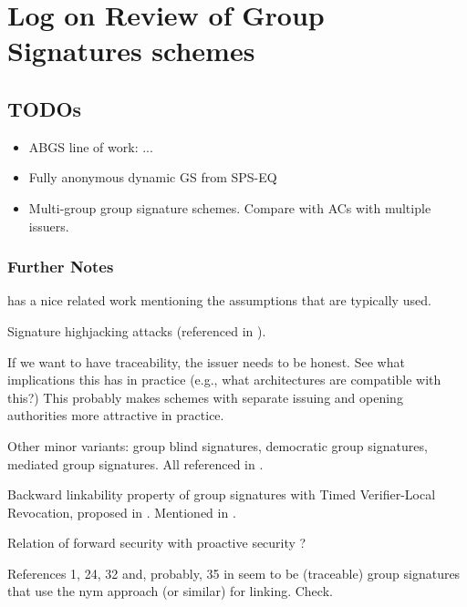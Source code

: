 \section{Log on Review of Group Signatures schemes}
\label{app:ac}

\subsection{TODOs}

\begin{itemize}
\item ABGS line of work: \cite{khad07a,khad07b}...
\item Fully anonymous dynamic GS from SPS-EQ \cite{ds16}
\item Multi-group group signature schemes. Compare with ACs with multiple
  issuers.
\end{itemize}

\subsubsection{Further Notes}


\cite{ehk+19} has a nice related work mentioning the assumptions that are
typically used.

Signature highjacking attacks (referenced in \cite{ehk+19}).

If we want to have traceability, the issuer needs to be honest. See what
implications this has in practice (e.g., what architectures are compatible
with this?) This probably makes schemes with separate issuing and opening
authorities more attractive in practice.

Other minor variants: group blind signatures, democratic group signatures,
mediated group signatures. All referenced in \cite[Section 1.3.5]{bsi12}.

Backward linkability property of group signatures with Timed Verifier-Local
Revocation, proposed in \cite{nf05}. Mentioned in \cite[Section 8.1.2]{bsi12}.

Relation of forward security with proactive security \cite{oy91}?

References 1, 24, 32 and, probably, 35 in \cite{bfg+11} seem to be (traceable)
group signatures that use the nym approach (or similar) for linking. Check.


